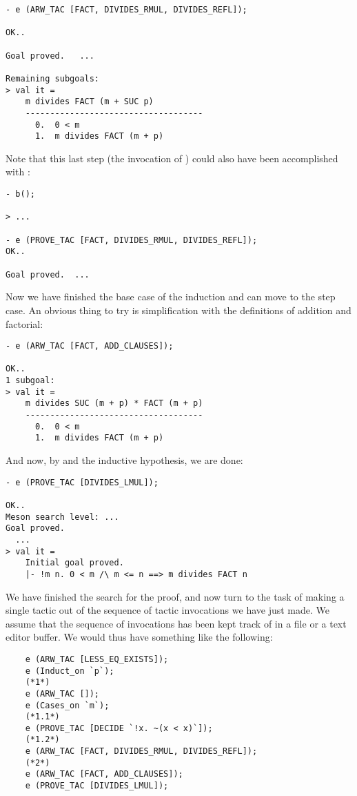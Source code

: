 \begin{session}\begin{verbatim}
- e (ARW_TAC [FACT, DIVIDES_RMUL, DIVIDES_REFL]);

OK..

Goal proved.   ...

Remaining subgoals:
> val it =
    m divides FACT (m + SUC p)
    ------------------------------------
      0.  0 < m
      1.  m divides FACT (m + p)
\end{verbatim}\end{session}
Note that this last step (the invocation of )
could also have been accomplished with :
\begin{session}\begin{verbatim}
- b();

> ...

- e (PROVE_TAC [FACT, DIVIDES_RMUL, DIVIDES_REFL]);
OK..

Goal proved.  ...
\end{verbatim}\end{session}
Now we have finished the base case of the induction and can move to the
step case. An obvious thing to try is simplification with the
definitions of addition and factorial:
\begin{session}\begin{verbatim}
- e (ARW_TAC [FACT, ADD_CLAUSES]);

OK..
1 subgoal:
> val it =
    m divides SUC (m + p) * FACT (m + p)
    ------------------------------------
      0.  0 < m
      1.  m divides FACT (m + p)
\end{verbatim}\end{session}
\noindent And now, by  and the inductive hypothesis, we are
done:
\begin{session}\begin{verbatim}
- e (PROVE_TAC [DIVIDES_LMUL]);

OK..
Meson search level: ...
Goal proved.
  ...
> val it =
    Initial goal proved.
    |- !m n. 0 < m /\ m <= n ==> m divides FACT n
\end{verbatim}\end{session}
We have finished the search for the proof, and now turn to the task of
making a single tactic out of the sequence of tactic invocations we have
just made. We assume that the sequence of invocations has been kept
track of in a file or a text editor buffer. We would thus have something
like the following:
{\small \begin{verbatim}
    e (ARW_TAC [LESS_EQ_EXISTS]);
    e (Induct_on `p`);
    (*1*)
    e (ARW_TAC []);
    e (Cases_on `m`);
    (*1.1*)
    e (PROVE_TAC [DECIDE `!x. ~(x < x)`]);
    (*1.2*)
    e (ARW_TAC [FACT, DIVIDES_RMUL, DIVIDES_REFL]);
    (*2*)
    e (ARW_TAC [FACT, ADD_CLAUSES]);
    e (PROVE_TAC [DIVIDES_LMUL]);
\end{verbatim}}
\noindent

